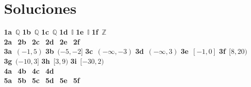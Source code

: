 \clearpage
\section{Soluciones}
\textbf{1a}~$\mathbb{Q}$
\textbf{1b}~$\mathbb{Q}$
\textbf{1c}~$\mathbb{Q}$
\textbf{1d}~$\mathbb{I}$
\textbf{1e}~$\mathbb{I}$
\textbf{1f}~$\mathbb{Z}$ \\
\textbf{2a}~$ $
\textbf{2b}~$ $
\textbf{2c}~$ $
\textbf{2d}~$ $
\textbf{2e}~$ $
\textbf{2f}~$ $ \\
\textbf{3a}~$(-1,5)$
\textbf{3b}~$(-5,-2]$
\textbf{3c}~$(-\infty, -3)$
\textbf{3d}~$(-\infty, 3)$
\textbf{3e}~$[-1,0]$
\textbf{3f}~$[8,20)$
\textbf{3g}~$(-10,3]$
\textbf{3h}~$[3,9)$
\textbf{3i}~$[-30,2)$ \\
\textbf{4a}~$ $
\textbf{4b}~$ $
\textbf{4c}~$ $
\textbf{4d}~$ $ \\
\textbf{5a}~$ $
\textbf{5b}~$ $
\textbf{5c}~$ $
\textbf{5d}~$ $
\textbf{5e}~$ $
\textbf{5f}~$ $ \\